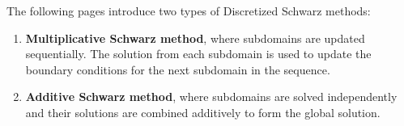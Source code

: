 \highspace
The following pages introduce two types of Discretized Schwarz methods:
\begin{enumerate}
    \item \textbf{Multiplicative Schwarz method}, where subdomains are updated sequentially. The solution from each subdomain is used to update the boundary conditions for the next subdomain in the sequence.

    \item \textbf{Additive Schwarz method}, where subdomains are solved independently and their solutions are combined additively to form the global solution.
\end{enumerate}